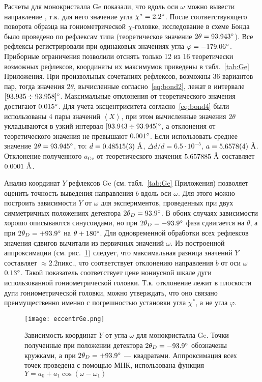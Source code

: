 Расчеты для монокристалла Ge показали, что вдоль оси $\omega$ можно вывести направление , т.к. для него значение угла $\chi^\ast = 2.2^\circ$.
После соответствующего поворота образца на гониометрической $\chi$-головке, исследование в схеме Бонда было проведено по рефлексам типа  (теоретическое значение $2\theta = 93.943^\circ$).
Все рефлексы регистрировали при одинаковых значениях угла $\varphi = -179.06^\circ$.
Приборные ограничения позволили отснять только 12 из 16 теоретически возможных рефлексов, координаты их максимумов приведены в табл.~\ref{tab:Ge} Приложения.
При произвольных сочетаниях рефлексов, возможны 36 вариантов пар, тогда значения $2\theta$, вычисленные согласно~\ref{eq:bond2}, лежат в интервале $[93.935\div93.958]^\circ$.
Максимальные отклонения от теоретического значения достигают $0.015^\circ$.
Для учета эксцентриситета согласно~\ref{eq:bond4} были использованы 4 пары значений $\left<X\right>$, при этом вычисленные значения $2\theta$ укладываются в узкий интервал $[93.943\div93.945]^\circ$, а отклонения от теоретического значения не превышают $0.001^\circ$.
Если использовать среднее значение $2\theta = 93.945^\circ$, то: $d = 0.48515 (3)\ \text{\AA}$, $\Delta d / d = 6.5 \cdot 10^{-5}$, $a = 5.6578 (4)\ \text{\AA}$.
Отклонение полученного $a_\text{Ge}$ от теоретического значения $5.657885\ \text{\AA}$ составляет 
$0.0001\ \text{\AA}$.

Анализ координат $Y$ рефлексов Ge (см. табл.~\ref{tab:Ge} Приложения) позволяет оценить точность выведения направления $b$ вдоль оси $\omega$.
Для этого можно построить зависимости $Y$ от $\omega$ для экспериментов, проведенных при двух симметричных положениях детектора $2\theta_D = 93.9^\circ$.
В обоих случаях зависимости хорошо описываются синусоидами, но при $2\theta_D = -93.9^\circ$ фаза сдвигается на $\theta$, а при $2\theta_D = +93.9^\circ$ на $\theta + 180^\circ$.
Для одновременной обработки всех рефлексов значения сдвигов вычитали из первичных значений $\omega$.
Из построенной аппроксимации (см. рис.~\ref{fig:eccentrGe}) следует, что максимальная разница значений $Y$ составляет $\approx 2.2\unit{пикс.}$, что соответствует отклонению направления $b$ от оси $\omega$ $0.13^\circ$.
Такой показатель соответствует цене нониусной шкале дуги использованной гониометрической головки.
Т.к. отклонение лежит в плоскости дуги гониометрической головки, можно утверждать, что оно связано преимущественно именно с погрешностью установки угла $\chi^\ast$, а не угла $\varphi$.

\begin{figure}[ht!]
    \centering
    \texttt{[image: eccentrGe.png]}
    \caption{
        Зависимость координат $Y$ от угла $\omega$ для монокристалла Ge.
        Точки полученные при положении детектора $2\theta_D = -93.9^\circ$ обозначены кружками, а при $2\theta_D = +93.9^\circ$ --- квадратами.
        Аппроксимация всех точек проведена с помощью МНК, использована функция $Y = a_0 + a_1 \cos(\omega - \omega_1)$
    }%
    \label{fig:eccentrGe}
\end{figure}

